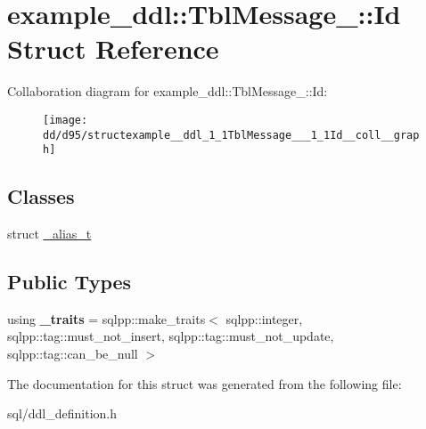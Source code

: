 \hypertarget{structexample__ddl_1_1TblMessage___1_1Id}{}\section{example\+\_\+ddl\+:\+:Tbl\+Message\+\_\+\+:\+:Id Struct Reference}
\label{structexample__ddl_1_1TblMessage___1_1Id}


Collaboration diagram for example\+\_\+ddl\+:\+:Tbl\+Message\+\_\+\+:\+:Id\+:
\nopagebreak
\begin{figure}[H]
\begin{center}
\leavevmode
\texttt{[image: dd/d95/structexample\_\_ddl\_1\_1TblMessage\_\_\_1\_1Id\_\_coll\_\_graph]}
\end{center}
\end{figure}
\subsection*{Classes}
\begin{DoxyCompactItemize}
\item 
struct \hyperlink{structexample__ddl_1_1TblMessage___1_1Id_1_1__alias__t}{\+\_\+alias\+\_\+t}
\end{DoxyCompactItemize}
\subsection*{Public Types}
\begin{DoxyCompactItemize}
\item 
\hypertarget{structexample__ddl_1_1TblMessage___1_1Id_a4cee3d2539b759618f5d45a689f11533}{}using {\bfseries \+\_\+traits} = sqlpp\+::make\+\_\+traits$<$ sqlpp\+::integer, sqlpp\+::tag\+::must\+\_\+not\+\_\+insert, sqlpp\+::tag\+::must\+\_\+not\+\_\+update, sqlpp\+::tag\+::can\+\_\+be\+\_\+null $>$\label{structexample__ddl_1_1TblMessage___1_1Id_a4cee3d2539b759618f5d45a689f11533}

\end{DoxyCompactItemize}


The documentation for this struct was generated from the following file\+:\begin{DoxyCompactItemize}
\item 
sql/ddl\+\_\+definition.\+h\end{DoxyCompactItemize}
